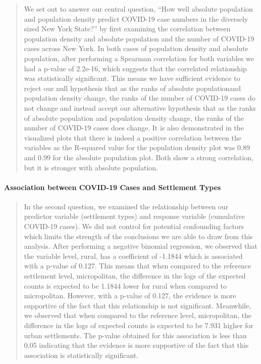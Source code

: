 \documentclass[
  12pt,
]{article}
\begin{document}
\begin{quote}
We set out to answer our central question, ``How well absolute
population and population density predict COVID-19 case numbers in the
diversely sized New York State?'' by first examining the correlation
between population density and absolute population and the number of
COVID-19 cases across New York. In both cases of population density and
absolute population, after performing a Spearman correlation for both
variables we had a p-value of 2.2e-16, which suggests that the
correlated relationship was statistically significant. This means we
have sufficient evidence to reject our null hypothesis that as the ranks
of absolute populationand population density change, the ranks of the
number of COVID-19 cases do not change and instead accept our
alternative hypothesis that as the ranks of absolute population and
population density change, the ranks of the number of COVID-19 cases
does change. It is also demonstrated in the visualized plots that there
is indeed a positive correlation between the variables as the R-squared
value for the population density plot was 0.89 and 0.99 for the absolute
population plot. Both show a strong correlation, but it is stronger with
absolute population.
\end{quote}

\hypertarget{association-between-covid-19-cases-and-settlement-types}{%
\paragraph{Association between COVID-19 Cases and Settlement
Types}\label{association-between-covid-19-cases-and-settlement-types}}

\begin{quote}
In the second question, we examined the relationship between our
predictor variable (settlement types) and response variable (cumulative
COVID-19 cases). We did not control for potential confounding factors
which limits the strength of the conclusions we are able to draw from
this analysis. After performing a negative binomial regression, we
observed that the variable level, rural, has a coefficient of -1.1844
which is associated with a p-value of 0.127. This means that when
compared to the reference settlement level, micropolitan, the difference
in the logs of the expected counts is expected to be 1.1844 lower for
rural when compared to micropolitan. However, with a p-value of 0.127,
the evidence is more supportive of the fact that this relationship is
not significant. Meanwhile, we observed that when compared to the
reference level, micropolitan, the difference in the logs of expected
counts is expected to be 7.931 higher for urban settlements. The p-value
obtained for this association is less than 0.05 indicating that the
evidence is more supportive of the fact that this association is
statistically significant.
\end{quote}
\end{document}
